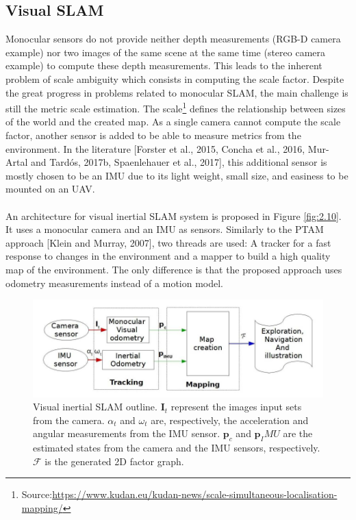 \documentclass[11pt,openany]{book}
\begin{document}
\subsection{Visual SLAM}
Monocular sensors do not provide neither depth measurements (RGB-D camera example) nor two images of the same scene at the same time (stereo camera example) to compute these depth measurements. This leads to the inherent problem of scale ambiguity which consists in computing the scale factor. Despite the great progress in problems related to monocular SLAM, the main challenge is still the metric scale estimation. The scale\footnote{Source:\url{https://www.kudan.eu/kudan-news/scale-simultaneous-localisation-mapping/}} deﬁnes the relationship between sizes of the world and the created map. As a single camera cannot compute the scale factor, another sensor is added to be able to measure metrics from the environment. In the literature [Forster et al., 2015, Concha et al., 2016, Mur-Artal and Tardós, 2017b, Spaenlehauer et al., 2017], this additional sensor is mostly chosen to be an IMU due to its light weight, small size, and easiness to be mounted on an UAV.\\\\
An architecture for visual inertial SLAM system is proposed in Figure \ref{fig:2.10}. It uses a monocular camera and an IMU as sensors. Similarly to the PTAM approach [Klein and Murray, 2007], two threads are used: A tracker for a fast response to changes in the environment and a mapper to build a high quality map of the environment. The only diﬀerence is that the proposed approach uses odometry measurements instead of a motion model.
\begin{figure}[H]
    \centering
    \includegraphics[scale=0.6]{assets/2_10.png}
    \caption{Visual inertial SLAM outline. $\mathbf{I}_t$ represent the images input sets from the camera. $\alpha_t$ and $\omega_t$ are, respectively, the acceleration and angular measurements from the IMU sensor. $\mathbf{p}_c$ and $\mathbf{p}_IMU$ are the estimated states from the camera and the IMU sensors, respectively. $\mathcal{F}$ is the generated 2D factor graph.}
\end{figure}
\end{document}

